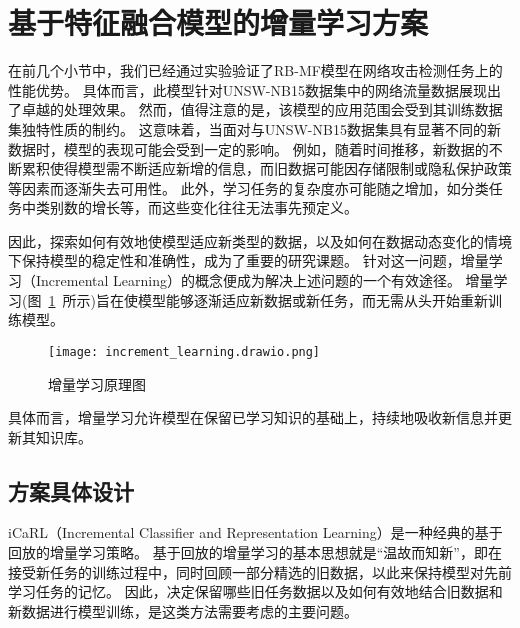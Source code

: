 \section{基于特征融合模型的增量学习方案}
在前几个小节中，我们已经通过实验验证了RB-MF模型在网络攻击检测任务上的性能优势。
具体而言，此模型针对UNSW-NB15数据集中的网络流量数据展现出了卓越的处理效果。
然而，值得注意的是，该模型的应用范围会受到其训练数据集独特性质的制约。
这意味着，当面对与UNSW-NB15数据集具有显著不同的新数据时，模型的表现可能会受到一定的影响。
例如，随着时间推移，新数据的不断累积使得模型需不断适应新增的信息，而旧数据可能因存储限制或隐私保护政策等因素而逐渐失去可用性。
此外，学习任务的复杂度亦可能随之增加，如分类任务中类别数的增长等，而这些变化往往无法事先预定义。\par

因此，探索如何有效地使模型适应新类型的数据，以及如何在数据动态变化的情境下保持模型的稳定性和准确性，成为了重要的研究课题。
针对这一问题，增量学习（Incremental Learning）的概念便成为解决上述问题的一个有效途径。
增量学习(图~\ref{fig:incremental_learning}~所示)旨在使模型能够逐渐适应新数据或新任务，而无需从头开始重新训练模型。
\begin{figure}[htbp]
	\centering
	\texttt{[image: increment\_learning.drawio.png]}
	\caption{增量学习原理图}
	\label{fig:incremental_learning}
\end{figure}
具体而言，增量学习允许模型在保留已学习知识的基础上，持续地吸收新信息并更新其知识库。

\subsection{方案具体设计}
iCaRL（Incremental Classifier and Representation Learning）\cite{rebuffi2017icarl}是一种经典的基于回放的增量学习策略。
基于回放的增量学习的基本思想就是“温故而知新”，即在接受新任务的训练过程中，同时回顾一部分精选的旧数据，以此来保持模型对先前学习任务的记忆。
因此，决定保留哪些旧任务数据以及如何有效地结合旧数据和新数据进行模型训练，是这类方法需要考虑的主要问题。\par

